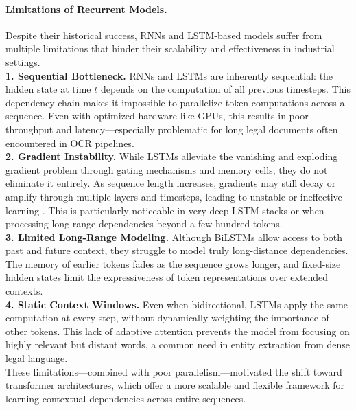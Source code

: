 \documentclass{article}
\begin{document}
\paragraph{Limitations of Recurrent Models.}
Despite their historical success, RNNs and LSTM-based models suffer from multiple limitations that hinder their scalability and effectiveness in industrial settings. \\

\textbf{1. Sequential Bottleneck.}
RNNs and LSTMs are inherently sequential: the hidden state at time $t$ depends on the computation of all previous timesteps. This dependency chain makes it impossible to parallelize token computations across a sequence. Even with optimized hardware like GPUs, this results in poor throughput and latency—especially problematic for long legal documents often encountered in OCR pipelines. \\

\textbf{2. Gradient Instability.}
While LSTMs alleviate the vanishing and exploding gradient problem through gating mechanisms and memory cells, they do not eliminate it entirely. As sequence length increases, gradients may still decay or amplify through multiple layers and timesteps, leading to unstable or ineffective learning \cite{pascanu2013difficulty}. This is particularly noticeable in very deep LSTM stacks or when processing long-range dependencies beyond a few hundred tokens. \\

\textbf{3. Limited Long-Range Modeling.}
Although BiLSTMs allow access to both past and future context, they struggle to model truly long-distance dependencies. The memory of earlier tokens fades as the sequence grows longer, and fixed-size hidden states limit the expressiveness of token representations over extended contexts. \\

\textbf{4. Static Context Windows.}
Even when bidirectional, LSTMs apply the same computation at every step, without dynamically weighting the importance of other tokens. This lack of adaptive attention prevents the model from focusing on highly relevant but distant words, a common need in entity extraction from dense legal language. \\

These limitations—combined with poor parallelism—motivated the shift toward transformer architectures, which offer a more scalable and flexible framework for learning contextual dependencies across entire sequences.
\end{document}

